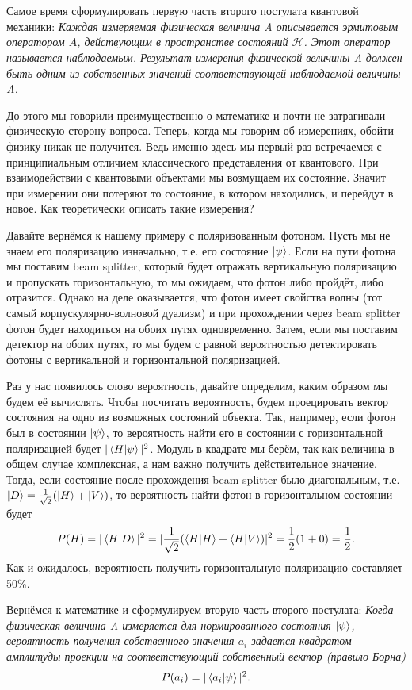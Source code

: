 Самое время сформулировать первую часть второго постулата квантовой механики: \textit{Каждая измеряемая физическая величина A описывается эрмитовым оператором $\hat{A}$, действующим в пространстве состояний $\mathcal{H}$. Этот оператор называется наблюдаемым. Результат измерения физической величины A должен быть одним из собственных значений соответствующей наблюдаемой величины A.}

До этого мы говорили преимущественно о математике и почти не затрагивали физическую сторону вопроса. Теперь, когда мы говорим об измерениях, обойти физику никак не получится. Ведь именно здесь мы первый раз встречаемся с принципиальным отличием классического представления от квантового. При взаимодействии с квантовыми объектами мы возмущаем их состояние. Значит при измерении они потеряют то состояние, в котором находились, и перейдут в новое. Как теоретически описать такие измерения? 

Давайте вернёмся к нашему примеру с поляризованным фотоном. Пусть мы не знаем его поляризацию изначально, т.е. его состояние $\ket{\psi}$. Если на пути фотона мы поставим beam splitter, который будет отражать вертикальную поляризацию и пропускать горизонтальную, то мы ожидаем, что фотон либо пройдёт, либо отразится. Однако на деле оказывается, что фотон имеет свойства волны (тот самый корпускулярно-волновой дуализм) и при прохождении через beam splitter фотон будет находиться на обоих путях одновременно. Затем, если мы поставим детектор на обоих путях, то мы будем с равной вероятностью детектировать фотоны с вертикальной и горизонтальной поляризацией. 

Раз у нас появилось слово вероятность, давайте определим, каким образом мы будем её вычислять. Чтобы посчитать вероятность, будем проецировать вектор состояния на одно из возможных состояний объекта. Так, например, если фотон был в состоянии $\ket{\psi}$, то вероятность найти его в состоянии с горизонтальной поляризацией будет $|\bra{H}\ket{\psi}|^2$. Модуль в квадрате мы берём, так как величина в общем случае комплексная, а нам важно получить действительное значение. Тогда, если состояние после прохождения beam splitter было диагональным, т.е. $\ket{D} = \frac{1}{\sqrt{2}}(\ket{H} + \ket{V})$, то вероятность найти фотон в горизонтальном состоянии будет
\[
P(H) = |\bra{H}\ket{D}|^2 = |\frac{1}{\sqrt{2}} (\bra{H}\ket{H} + \bra{H}\ket{V})|^2 = \frac{1}{2}(1 + 0) = \frac{1}{2}.
\]
Как и ожидалось, вероятность получить горизонтальную поляризацию составляет 50\%.

Вернёмся к математике и сформулируем вторую часть второго постулата: \textit{Когда физическая величина A измеряется для нормированного состояния $\ket{\psi}$, вероятность получения собственного значения $a_i$ задается квадратом амплитуды проекции на соответствующий собственный вектор (правило Борна)}
\[
P(a_i) = |\bra{a_i}\ket{\psi}|^2.
\]

